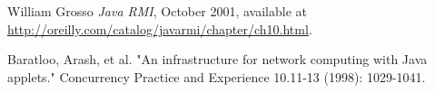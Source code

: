 \begin{thebibliography}{9}

 William Grosso \emph{Java RMI},  October 2001, available at 
\url{http://oreilly.com/catalog/javarmi/chapter/ch10.html}.

Baratloo, Arash, et al. "An infrastructure for network computing with Java applets." Concurrency Practice and Experience 10.11-13 (1998): 1029-1041.



\end{thebibliography}